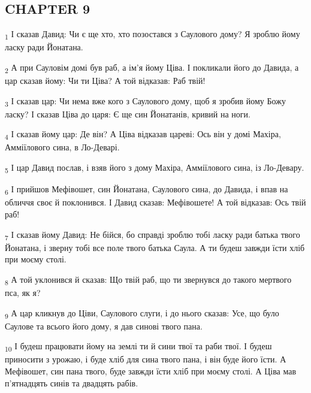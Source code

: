 \subsection{CHAPTER 9}
\begin{tcolorbox}
\textsubscript{1} І сказав Давид: Чи є ще хто, хто позостався з Саулового дому? Я зроблю йому ласку ради Йонатана.
\end{tcolorbox}
\begin{tcolorbox}
\textsubscript{2} А при Сауловім домі був раб, а ім'я йому Ціва. І покликали його до Давида, а цар сказав йому: Чи ти Ціва? А той відказав: Раб твій!
\end{tcolorbox}
\begin{tcolorbox}
\textsubscript{3} І сказав цар: Чи нема вже кого з Саулового дому, щоб я зробив йому Божу ласку? І сказав Ціва до царя: Є ще син Йонатанів, кривий на ноги.
\end{tcolorbox}
\begin{tcolorbox}
\textsubscript{4} І сказав йому цар: Де він? А Ціва відказав цареві: Ось він у домі Махіра, Амміїлового сина, в Ло-Деварі.
\end{tcolorbox}
\begin{tcolorbox}
\textsubscript{5} І цар Давид послав, і взяв його з дому Махіра, Амміїлового сина, із Ло-Девару.
\end{tcolorbox}
\begin{tcolorbox}
\textsubscript{6} І прийшов Мефівошет, син Йонатана, Саулового сина, до Давида, і впав на обличчя своє й поклонився. І Давид сказав: Мефівошете! А той відказав: Ось твій раб!
\end{tcolorbox}
\begin{tcolorbox}
\textsubscript{7} І сказав йому Давид: Не бійся, бо справді зроблю тобі ласку ради батька твого Йонатана, і зверну тобі все поле твого батька Саула. А ти будеш завжди їсти хліб при моєму столі.
\end{tcolorbox}
\begin{tcolorbox}
\textsubscript{8} А той уклонився й сказав: Що твій раб, що ти звернувся до такого мертвого пса, як я?
\end{tcolorbox}
\begin{tcolorbox}
\textsubscript{9} А цар кликнув до Ціви, Саулового слуги, і до нього сказав: Усе, що було Саулове та всього його дому, я дав синові твого пана.
\end{tcolorbox}
\begin{tcolorbox}
\textsubscript{10} І будеш працювати йому на землі ти й сини твої та раби твої. І будеш приносити з урожаю, і буде хліб для сина твого пана, і він буде його їсти. А Мефівошет, син пана твого, буде завжди їсти хліб при моєму столі. А Ціва мав п'ятнадцять синів та двадцять рабів.
\end{tcolorbox}
